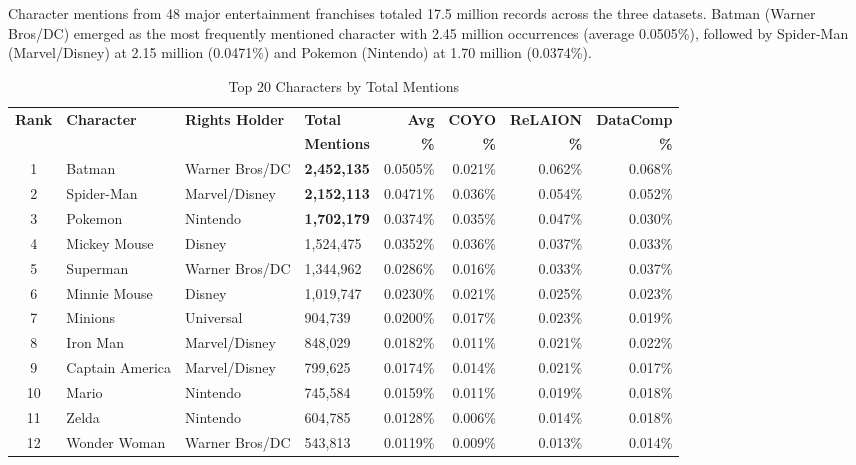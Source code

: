 \documentclass[11pt]{article}
\begin{document}
Character mentions from 48 major entertainment franchises totaled 17.5 million records across the three datasets. Batman (Warner Bros/DC) emerged as the most frequently mentioned character with 2.45 million occurrences (average 0.0505\%), followed by Spider-Man (Marvel/Disney) at 2.15 million (0.0471\%) and Pokemon (Nintendo) at 1.70 million (0.0374\%).

\begin{table}[htbp]
\centering
\caption{Top 20 Characters by Total Mentions}
\label{tab:top_characters}
\small
\begin{tabular}{clllrrrr}
\toprule
\textbf{Rank} & \textbf{Character} & \textbf{Rights Holder} & \textbf{Total} & \textbf{Avg} & \textbf{COYO} & \textbf{ReLAION} & \textbf{DataComp} \\
 & & & \textbf{Mentions} & \textbf{\%} & \textbf{\%} & \textbf{\%} & \textbf{\%} \\
\midrule
1  & Batman         & Warner Bros/DC   & \textbf{2,452,135} & 0.0505\% & 0.021\% & 0.062\% & 0.068\% \\
2  & Spider-Man     & Marvel/Disney    & \textbf{2,152,113} & 0.0471\% & 0.036\% & 0.054\% & 0.052\% \\
3  & Pokemon        & Nintendo         & \textbf{1,702,179} & 0.0374\% & 0.035\% & 0.047\% & 0.030\% \\
4  & Mickey Mouse   & Disney           & 1,524,475 & 0.0352\% & 0.036\% & 0.037\% & 0.033\% \\
5  & Superman       & Warner Bros/DC   & 1,344,962 & 0.0286\% & 0.016\% & 0.033\% & 0.037\% \\
6  & Minnie Mouse   & Disney           & 1,019,747 & 0.0230\% & 0.021\% & 0.025\% & 0.023\% \\
7  & Minions        & Universal        & 904,739   & 0.0200\% & 0.017\% & 0.023\% & 0.019\% \\
8  & Iron Man       & Marvel/Disney    & 848,029   & 0.0182\% & 0.011\% & 0.021\% & 0.022\% \\
9  & Captain America & Marvel/Disney   & 799,625   & 0.0174\% & 0.014\% & 0.021\% & 0.017\% \\
10 & Mario          & Nintendo         & 745,584   & 0.0159\% & 0.011\% & 0.019\% & 0.018\% \\
11 & Zelda          & Nintendo         & 604,785   & 0.0128\% & 0.006\% & 0.014\% & 0.018\% \\
12 & Wonder Woman   & Warner Bros/DC   & 543,813   & 0.0119\% & 0.009\% & 0.013\% & 0.014\% \\

\end{tabular}
\end{table}
\end{document}
